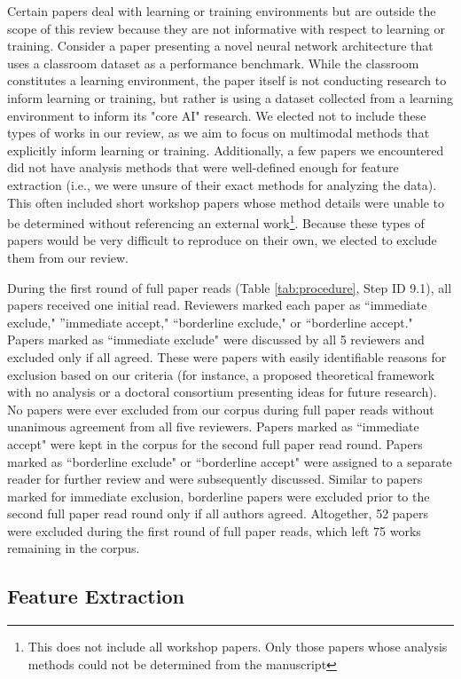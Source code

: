 \documentclass[manuscript,screen,review]{acmart}
\begin{document}
Certain papers deal with learning or training environments but are outside the scope of this review because they are not informative with respect to learning or training. Consider a paper presenting a novel neural network architecture that uses a classroom dataset as a performance benchmark. While the classroom constitutes a learning environment, the paper itself is not conducting research to inform learning or training, but rather is using a dataset collected from a learning environment to inform its "core AI" research. We elected not to include these types of works in our review, as we aim to focus on multimodal methods that explicitly inform learning or training. Additionally, a few papers we encountered did not have analysis methods that were well-defined enough for feature extraction (i.e., we were unsure of their exact methods for analyzing the data). This often included short workshop papers whose method details were unable to be determined without referencing an external work\footnote{This does not include all workshop papers. Only those papers whose analysis methods could not be determined from the manuscript}. Because these types of papers would be very difficult to reproduce on their own, we elected to exclude them from our review.

During the first round of full paper reads (Table \ref{tab:procedure}, Step ID 9.1), all papers received one initial read. Reviewers marked each paper as ``immediate exclude," ''immediate accept," ``borderline exclude," or ``borderline accept." Papers marked as ``immediate exclude" were discussed by all 5 reviewers and excluded only if all agreed. These were papers with easily identifiable reasons for exclusion based on our criteria (for instance, a proposed theoretical framework with no analysis or a doctoral consortium presenting ideas for future research). No papers were ever excluded from our corpus during full paper reads without unanimous agreement from all five reviewers. Papers marked as ``immediate accept" were kept in the corpus for the second full paper read round. Papers marked as ``borderline exclude" or ``borderline accept" were assigned to a separate reader for further review and were subsequently discussed. Similar to papers marked for immediate exclusion, borderline papers were excluded prior to the second full paper read round only if all authors agreed. Altogether, 52 papers were excluded during the first round of full paper reads, which left 75 works remaining in the corpus. 

\subsection{Feature Extraction} \label{subsec:feature_extraction}
\end{document}
